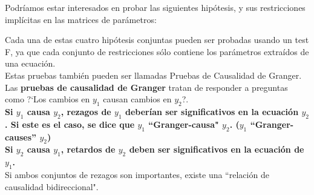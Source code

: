 	
	Podr\'{i}amos estar interesados en probar las siguientes hip\'otesis, y sus restricciones impl\'{i}citas en las matrices de par\'ametros:\\
	\begin{figure}[H]
	\end{figure}
	
	Cada una de estas cuatro hip\'otesis conjuntas pueden ser probadas usando un test F, ya que cada conjunto de restricciones s\'olo contiene los par\'ametros extra\'{i}dos de una ecuaci\'on.\\
	
	Estas pruebas tambi\'en pueden ser llamadas Pruebas de Causalidad de Granger.\\
	
%	
	Las \textbf{pruebas de causalidad de Granger} tratan de responder a preguntas como ?`Los cambios en $y_1$ causan cambios en $y_2$?.\\
	\textbf{Si $y_1$ causa $y_2$, rezagos de $y_1$ deber\'{i}an ser significativos en la ecuaci\'on $y_2$. Si este es el caso, se dice que $y_1$ ``Granger-causa" $y_2$. ($y_1$ ``Granger-causes” $y_2$)}\\
	
	\textbf{Si $y_2$ causa $y_1$, retardos de $y_2$ deben ser significativos en la ecuaci\'on de $y_1$.}\\
	
	Si ambos conjuntos de rezagos son importantes, existe una ``relaci\'on de causalidad bidireccional".\\
	
